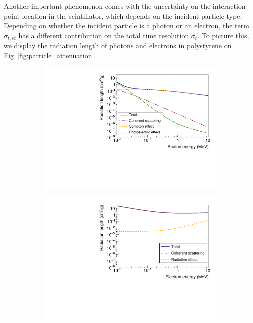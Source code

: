 Another important phenomenon comes with the uncertainty on the interaction point location in the scintillator, which depends on the incident particle type.
Depending on whether the incident particle is a photon or an electron, the term $\sigma_{t,\text{sc}}$ has a different contribution on the total time resolution $\sigma_{t}$.
To picture this, we display the radiation length of photons and electrons in polystyrene on Fig~\ref{fig:particle_attenuation}.
\begin{figure}[h]
  \centering
  \begin{subfigure}[t]{0.48\textwidth}
    \centering
    \includegraphics[width=1\textwidth]{commissioning/fig_commissioning/photon_energy_loss.pdf}
    \captionsetup{justification=justified}
    \caption{
      \label{subfig:photon}}
  \end{subfigure}
  \hfill
  \begin{subfigure}[t]{0.48\textwidth}
    \centering
    \includegraphics[width=1\textwidth]{commissioning/fig_commissioning/electron_energy_loss.pdf}

\end{subfigure}
\end{figure}
